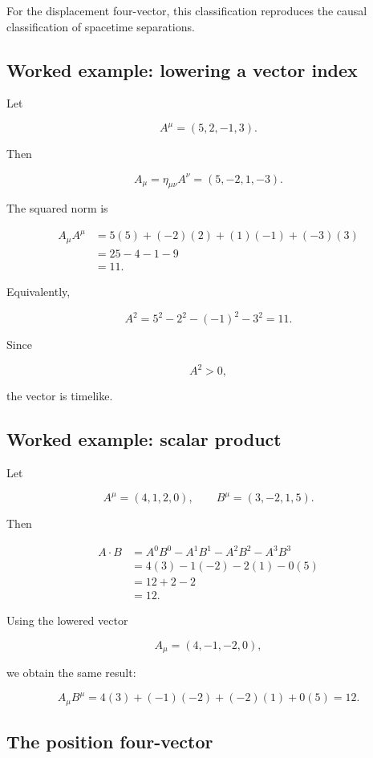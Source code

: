 For the displacement four-vector, this classification reproduces the causal classification of spacetime separations.

\subsection{Worked example: lowering a vector index}

Let

\[
A^{\mu}=(5,2,-1,3).
\]

Then

\[
A_{\mu}
=
\eta_{\mu\nu}A^{\nu}
=
(5,-2,1,-3).
\]

The squared norm is

\[
\begin{aligned}
A_{\mu}A^{\mu}
&=
5(5)
+(-2)(2)
+(1)(-1)
+(-3)(3)\\
&=
25-4-1-9\\
&=
11.
\end{aligned}
\]

Equivalently,

\[
A^{2}
=
5^{2}-2^{2}-(-1)^{2}-3^{2}
=11.
\]

Since

\[
A^{2}>0,
\]

the vector is timelike.

\subsection{Worked example: scalar product}

Let

\[
A^{\mu}=(4,1,2,0),
\qquad
B^{\mu}=(3,-2,1,5).
\]

Then

\[
\begin{aligned}
A\cdot B
&=
A^{0}B^{0}
-A^{1}B^{1}
-A^{2}B^{2}
-A^{3}B^{3}\\
&=
4(3)-1(-2)-2(1)-0(5)\\
&=
12+2-2\\
&=
12.
\end{aligned}
\]

Using the lowered vector

\[
A_{\mu}=(4,-1,-2,0),
\]

we obtain the same result:

\[
A_{\mu}B^{\mu}
=
4(3)+(-1)(-2)+(-2)(1)+0(5)
=12.
\]

\subsection{The position four-vector}

